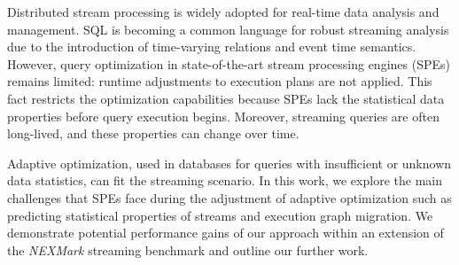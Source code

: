Distributed stream processing is widely adopted for real-time data analysis and management. SQL is becoming a common language for robust streaming analysis due to the introduction of time-varying relations and event time semantics. 
However, query optimization in state-of-the-art stream processing engines (SPEs) remains limited: runtime adjustments to execution plans are not applied. 
This fact restricts the optimization capabilities because SPEs lack the statistical data properties before query execution begins. Moreover, streaming queries are often long-lived, and these properties can  change over time. 

Adaptive optimization, used in databases for queries with insufficient or unknown  data statistics, can fit the streaming scenario. 
In this work, we explore the main challenges that SPEs face during the adjustment of adaptive optimization such as predicting statistical properties of streams and execution graph migration.
We demonstrate potential performance gains of our approach within an extension of the {\em NEXMark} streaming benchmark and outline our further work.

